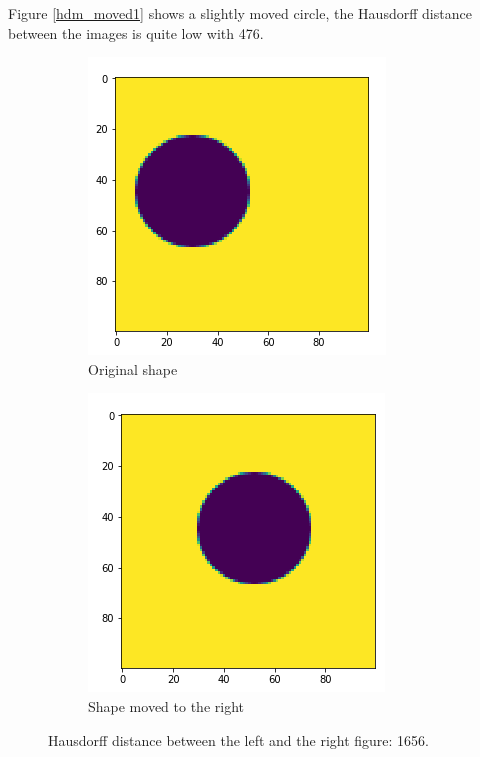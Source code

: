 Figure \ref{hdm_moved1} shows a slightly moved circle, the Hausdorff distance between the images is quite low with 476.

\begin{figure}[H]
    \centering
    \begin{subfigure}{.5\textwidth}
        \centering
        \includegraphics[width=.75\linewidth]{chapters/06_hdm/images/hdm_original.png}
        \caption{Original shape}
    \end{subfigure}%
    \begin{subfigure}{.5\textwidth}
        \centering
        \includegraphics[width=.75\linewidth]{chapters/06_hdm/images/hdm_moved2.png}
        \caption{Shape moved to the right}
    \end{subfigure}
    \caption{Hausdorff distance between the left and the right figure: 1656. }
    \label{hdm_moved2}
\end{figure}

